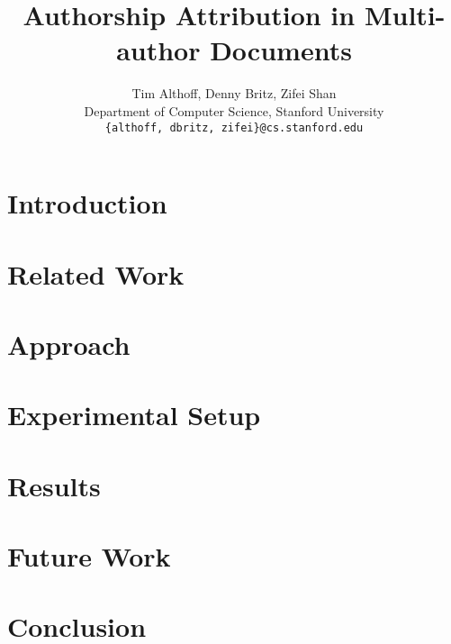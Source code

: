 \documentclass[11pt, oneside]{article}    %
\title{Authorship Attribution in Multi-author Documents}
\author{Tim Althoff, Denny Britz, Zifei Shan \\
  Department of Computer Science, Stanford University \\
  {\tt \{althoff, dbritz, zifei\}@cs.stanford.edu} \\
  }
\begin{document}
\maketitle

\begin{abstract}



\end{abstract}

\section{Introduction}\label{sec:intro}


\section{Related Work}\label{sec:related_work}


\section{Approach}\label{sec:approach}


\section{Experimental Setup}\label{sec:experiments}


\section{Results}\label{sec:results}


\section{Future Work}\label{sec:future_work}


\section{Conclusion}\label{sec:conclusion}




\end{document}

